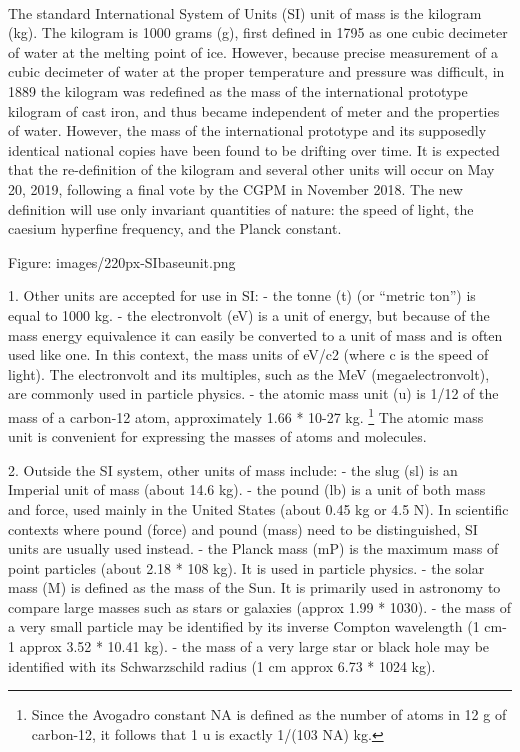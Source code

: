 \documentclass{book}
\begin{document}
	\paragraph{}
	The standard International System of Units (SI) unit of mass is the kilogram (kg). The kilogram is 1000 grams (g), first defined in 1795 as one cubic decimeter of water at the melting point of ice. However, because precise measurement of a cubic decimeter of water at the proper temperature and pressure was difficult, in 1889 the kilogram was redefined as the mass of the international prototype kilogram of cast iron, and thus became independent of meter and the properties of water. However, the mass of the international prototype and its supposedly identical national copies have been found to be drifting over time. It is expected that the re-definition of the kilogram and several other units will occur on May 20, 2019, following a final vote by the CGPM in November 2018. The new definition will use only invariant quantities of nature: the speed of light, the caesium hyperfine frequency, and the Planck constant.
	
	Figure: images/220px-SIbaseunit.png
	
	1. Other units are accepted for use in SI: - the tonne (t) (or ``metric ton'') is equal to 1000 kg. - the electronvolt (eV) is a unit of energy, but because of the mass energy equivalence it can easily be converted to a unit of mass and is often used like one. In this context, the mass units of eV/c2 (where c is the speed of light). The electronvolt and its multiples, such as the MeV (megaelectronvolt), are commonly used in particle physics. - the atomic mass unit (u) is 1/12 of the mass of a carbon-12 atom, approximately 1.66 * 10-27 kg. \footnote{Since the Avogadro constant NA is defined as the number of atoms in 12 g of carbon-12, it follows that 1 u is exactly 1/(103 NA) kg.} The atomic mass unit is convenient for expressing the masses of atoms and molecules.
	
	2. Outside the SI system, other units of mass include: - the slug (sl) is an Imperial unit of mass (about 14.6 kg). - the pound (lb) is a unit of both mass and force, used mainly in the United States (about 0.45 kg or 4.5 N). In scientific contexts where pound (force) and pound (mass) need to be distinguished, SI units are usually used instead. - the Planck mass (mP) is the maximum mass of point particles (about 2.18 * 108 kg). It is used in particle physics. - the solar mass (M) is defined as the mass of the Sun. It is primarily used in astronomy to compare large masses such as stars or galaxies (approx 1.99 * 1030). - the mass of a very small particle may be identified by its inverse Compton wavelength (1 cm-1 approx 3.52 * 10.41 kg). - the mass of a very large star or black hole may be identified with its Schwarzschild radius (1 cm approx 6.73 * 1024 kg).
	
\end{document}
